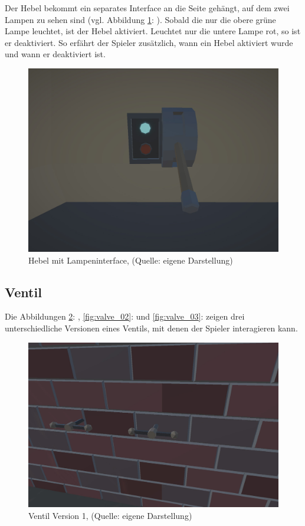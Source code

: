 Der Hebel bekommt ein separates Interface an die Seite gehängt, auf dem zwei Lampen zu sehen sind (vgl. Abbildung \ref{fig:lever_interactable_active_diods}: ). Sobald die nur die obere grüne Lampe leuchtet, ist der Hebel aktiviert. Leuchtet nur die untere Lampe rot, so ist er deaktiviert. So erfährt der Spieler zusätzlich, wann ein Hebel aktiviert wurde und wann er deaktiviert ist.

\begin{figure}[ht]
\centering
\includegraphics[width=0.8\linewidth]{content/pictures/Lever_activator_diod.jpg}
\caption{Hebel mit Lampeninterface, (Quelle: eigene Darstellung)}
\label{fig:lever_interactable_active_diods}
\end{figure}

\subsection{Ventil}
Die Abbildungen \ref{fig:valve_01}: , \ref{fig:valve_02}:  und \ref{fig:valve_03}:  zeigen drei unterschiedliche Versionen eines Ventils, mit denen der Spieler interagieren kann. 

\begin{figure}[ht]
\centering
\includegraphics[width=0.8\linewidth]{content/pictures/Vault.jpg}
\caption{Ventil Version 1, (Quelle: eigene Darstellung)}
\label{fig:valve_01}
\end{figure}

